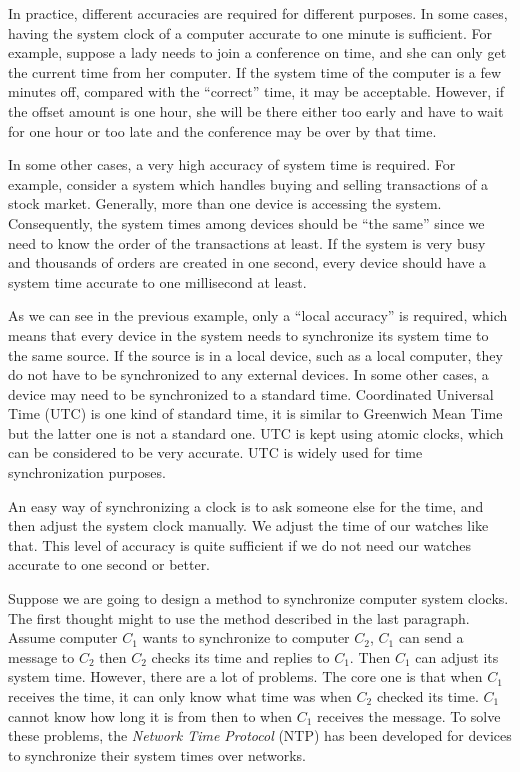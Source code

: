 In practice, different accuracies are required for different purposes. 
In some cases, having the system clock of a computer accurate to one
minute is sufficient. For example, suppose a lady needs to join a conference on
time, and she can only get the current time from her computer. If the system
time of the computer is a few minutes off, compared with the ``correct'' time,
it may be acceptable. However, if the offset amount is one hour, she will be
there either too early and have to wait for one hour or too late and the
conference may be over by that time.

In some other cases, a very high accuracy of system time is required. For
example, consider a system which handles buying and selling transactions of a
stock market.  Generally, more than one device is accessing the system.
Consequently, the system times among devices should be ``the same'' since we
need to know the order of the transactions at least. If the system is very busy
and thousands of orders are created in one second, every device should have a
system time accurate to one millisecond at least.

As we can see in the previous example, only a ``local accuracy'' is required,
which means that every device in the system needs to synchronize its system
time to the same source. If the source is in a local device, such as a local
computer, they do not
have to be synchronized to any external devices. In some other cases, a device
may need to be synchronized to a standard time. 
Coordinated Universal Time (UTC) is one kind of standard time, it is similar 
to Greenwich Mean Time but the latter one is not a standard one. UTC is kept
using atomic clocks, which can be considered to be very accurate. UTC is widely
used for time synchronization purposes.

An easy way of synchronizing a clock is to ask someone else for the time, and
then adjust the system clock manually. We adjust the time of our
watches like that. This level of accuracy is quite sufficient if we do not need
our watches accurate to one second or better. 

Suppose we are going to design a method to synchronize computer system clocks.
The first thought might to use the method described in the last paragraph.
Assume computer $C_1$ wants to synchronize to computer $C_2$, $C_1$ can
send a message to $C_2$ then $C_2$ checks its time and replies to $C_1$. Then
$C_1$ can adjust its system time.  However, there are a lot of problems.  The
core one is that when $C_1$ receives the time, it can only know what time was
when $C_2$ checked its time. $C_1$ cannot know how long it is from then to when
$C_1$ receives the message. To solve these problems, the \emph{Network Time
Protocol} (NTP) has been developed for devices
to synchronize their system times over networks. 

